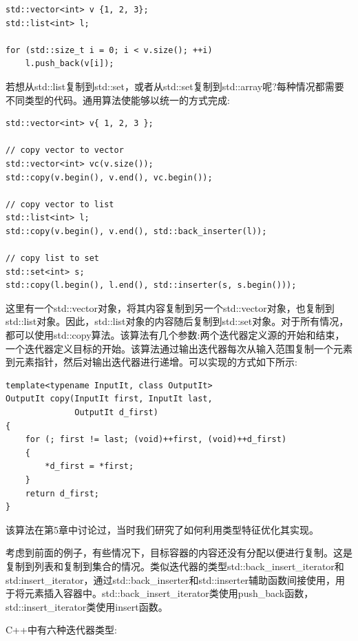 \begin{lstlisting}[style=styleCXX]
std::vector<int> v {1, 2, 3};
std::list<int> l;

for (std::size_t i = 0; i < v.size(); ++i)
	l.push_back(v[i]);
\end{lstlisting}

若想从std::list复制到std::set，或者从std::set复制到std::array呢?每种情况都需要不同类型的代码。通用算法使能够以统一的方式完成:

\begin{lstlisting}[style=styleCXX]
std::vector<int> v{ 1, 2, 3 };

// copy vector to vector
std::vector<int> vc(v.size());
std::copy(v.begin(), v.end(), vc.begin());

// copy vector to list
std::list<int> l;
std::copy(v.begin(), v.end(), std::back_inserter(l));

// copy list to set
std::set<int> s;
std::copy(l.begin(), l.end(), std::inserter(s, s.begin()));
\end{lstlisting}

这里有一个std::vector对象，将其内容复制到另一个std::vector对象，也复制到std::list对象。因此，std::list对象的内容随后复制到std::set对象。对于所有情况，都可以使用std::copy算法。该算法有几个参数:两个迭代器定义源的开始和结束，一个迭代器定义目标的开始。该算法通过输出迭代器每次从输入范围复制一个元素到元素指针，然后对输出迭代器进行递增。可以实现的方式如下所示:

\begin{lstlisting}[style=styleCXX]
template<typename InputIt, class OutputIt>
OutputIt copy(InputIt first, InputIt last,
			  OutputIt d_first)
{
	for (; first != last; (void)++first, (void)++d_first)
	{
		*d_first = *first;
	}
	return d_first;
}
\end{lstlisting}

\begin{tcolorbox}[breakable,enhanced jigsaw,colback=blue!5!white,colframe=blue!75!black,title={重要的Note}]
该算法在第5章中讨论过，当时我们研究了如何利用类型特征优化其实现。
\end{tcolorbox}

考虑到前面的例子，有些情况下，目标容器的内容还没有分配以便进行复制。这是复制到列表和复制到集合的情况。类似迭代器的类型std::back\_insert\_iterator和std:insert\_iterator，通过std::back\_inserter和std::inserter辅助函数间接使用，用于将元素插入容器中。std::back\_insert\_iterator类使用push\_back函数，std::insert\_iterator类使用insert函数。

C++中有六种迭代器类型:

